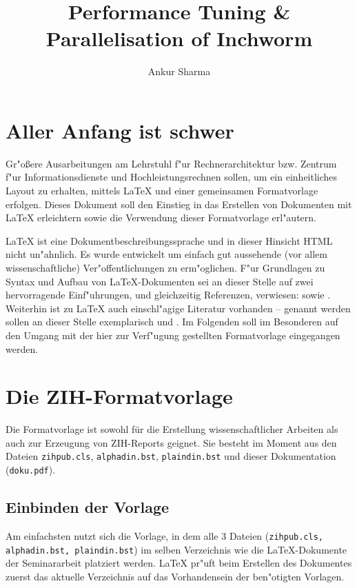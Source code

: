 \documentclass[plainarticle,zihtitle,english,final,hyperref,utf8]{zihpub}
\author{Ankur Sharma}
\title{Performance Tuning \& Parallelisation of Inchworm}
\begin{document}
\section{Aller Anfang ist schwer}
Gr"o{\ss}ere Ausarbeitungen am Lehrstuhl f"ur Rechnerarchitektur bzw. Zentrum f"ur Informationsdienste und Hochleistungsrechnen sollen, um ein einheitliches Layout zu erhalten, mittels {\LaTeX} und einer gemeinsamen Formatvorlage erfolgen. Dieses Dokument soll den Einstieg in das Erstellen von Dokumenten mit {\LaTeX} erleichtern sowie die Verwendung dieser Formatvorlage erl"autern.

{\LaTeX} ist eine Dokumentbeschreibungssprache und in dieser Hinsicht HTML nicht un"ahnlich. Es wurde entwickelt um einfach gut aussehende (vor allem wissenschaftliche) Ver"offentlichungen zu erm"oglichen. F"ur Grundlagen zu Syntax und Aufbau von {\LaTeX}-Dokumenten sei an dieser Stelle auf zwei hervorragende Einf"uhrungen, und gleichzeitig Referenzen, verwiesen: \cite{kochbuch} sowie \cite{rudl}. Weiterhin ist zu {\LaTeX} auch einschl"agige Literatur vorhanden -- genannt werden sollen an dieser Stelle exemplarisch \cite{begleiter} und \cite{kopka}. Im Folgenden soll im Besonderen auf den Umgang mit der hier zur Verf"ugung gestellten Formatvorlage eingegangen werden.

\section{Die ZIH-Formatvorlage}
Die Formatvorlage ist sowohl für die Erstellung wissenschaftlicher Arbeiten als auch zur Erzeugung von ZIH-Reports geignet. Sie besteht im Moment aus den Dateien \texttt{zihpub.cls}, \texttt{alphadin.bst}, \texttt{plaindin.bst} und dieser Dokumentation (\texttt{doku.pdf}).


\subsection{Einbinden der Vorlage}
Am einfachsten nutzt sich die Vorlage, in dem alle 3 Dateien (\texttt{zihpub.cls, alphadin.bst, plaindin.bst}) im selben Verzeichnis wie die {\LaTeX}-Dokumente der Seminararbeit platziert werden. {\LaTeX} pr"uft beim Erstellen des Dokumentes zuerst das aktuelle Verzeichnis auf das Vorhandensein der ben"otigten Vorlagen.
\end{document}
